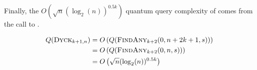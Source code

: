 \begin{appendix}
\begin{tproof}
{            Finally, the $O\left( \sqrt{n}(\log_2(n))^{0.5k} \right)$ quantum query complexity of  comes from the
            call to .

            \begin{align*}
                Q(\textrm{\textsc{Dyck$_{k+1,n}$}}) & = O\left(Q(\textrm{\textsc{FindAny$_{k+2}$}}(0,n+2k+1,s))\right) \\
                                         & = O\left(Q(\textrm{\textsc{FindAny$_{k+2}$}}(0, n, s))\right)    \\
                                         & = O\left( \sqrt{n}(\log_2(n))^{0.5k} \right)
            \end{align*}

        }

    \end{tproof}

\end{appendix}